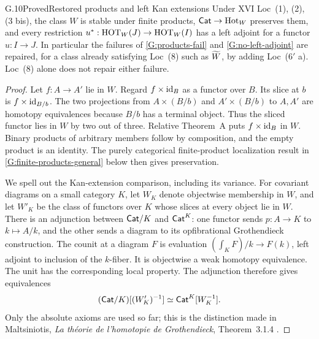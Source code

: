 \begin{claim}{G.10}{Proved}{Restored products and left Kan extensions}
\label{G:restored-theory}
Under XVI Loc~(1), (2), (3 bis), the class $W$ is stable under finite
products, $\mathsf{Cat}\to\operatorname{Hot}_W$ preserves them, and every restriction
$u^*:\operatorname{HOT}_W(J)\to\operatorname{HOT}_W(I)$ has a left adjoint for a functor
$u:I\to J$.  In particular the failures of \ref{G:products-fail}
and \ref{G:no-left-adjoint} are repaired, for a class already
satisfying Loc~(8) such as $\widetilde W$, by adding Loc~($6'$ a).  Loc~(8)
alone does not repair either failure.
\end{claim}
\begin{proof}
Let $f:A\to A'$ lie in $W$.  Regard $f\times\mathrm{id}_B$ as a functor
over $B$.  Its slice at $b$ is $f\times\mathrm{id}_{B/b}$.  The two
projections from $A\times(B/b)$ and $A'\times(B/b)$ to $A,A'$
are homotopy equivalences because $B/b$ has a terminal object.
Thus the sliced functor lies in $W$ by two out of three.  Relative
Theorem~A puts $f\times\mathrm{id}_B$ in $W$.  Binary products of arbitrary
members follow by composition, and the empty product is an identity.
The purely categorical finite-product localization result in
\ref{G:finite-products-general} below then gives preservation.

We spell out the Kan-extension comparison, including its variance.
For covariant diagrams on a small category $K$, let $W_K$ denote
objectwise membership in $W$, and let $W'_K$ be the class of functors
over $K$ whose slices at every object lie in $W$.  There is an
adjunction between $\mathsf{Cat}/K$ and $\mathsf{Cat}^K$: one functor sends
$p:A\to K$ to $k\mapsto A/k$, and the other sends a diagram to its
opfibrational Grothendieck construction.  The counit at a diagram
$F$ is evaluation
$(\int_KF)/k\to F(k)$, left adjoint to inclusion of the $k$-fiber.
It is objectwise a weak homotopy equivalence.  The unit has the
corresponding local property.  The adjunction therefore gives
equivalences
\[
 (\mathsf{Cat}/K)[(W'_K)^{-1}]\simeq\mathsf{Cat}^K[W_K^{-1}].
\]
Only the absolute axioms are used so far; this is the distinction
made in Maltsiniotis, \emph{La th\'eorie de l'homotopie de
Grothendieck}, Theorem~3.1.4 \cite{GMaltsiniotis2020}.


\end{proof}
